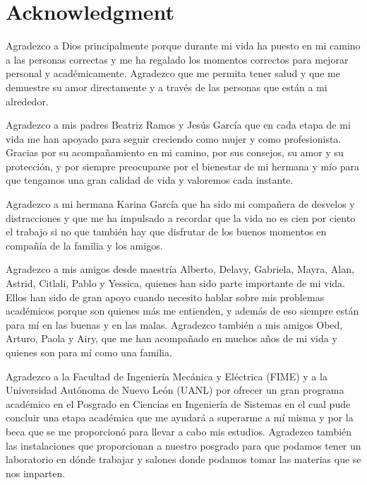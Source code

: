 
\chapter{Acknowledgment}

Agradezco a Dios principalmente porque durante mi vida ha puesto en mi camino a las personas correctas y me ha regalado los momentos correctos para mejorar personal y académicamente. Agradezco que me permita tener salud y que me demuestre su amor directamente y a través de las personas que están a mi alrededor. 

Agradezco a mis padres Beatriz Ramos y Jesús García que en cada etapa de mi vida me han apoyado para seguir creciendo como mujer y como profesionista. Gracias por su acompañamiento en mi camino, por sus consejos, su amor y su protección, y por siempre preocuparse por el bienestar de mi hermana y mío para que tengamos una gran calidad de vida y valoremos cada instante. 

Agradezco a mi hermana Karina García que ha sido mi compañera de desvelos y distracciones y que me ha impulsado a recordar que la vida no es cien por ciento el trabajo si no que también hay que disfrutar de los buenos momentos en compañía de la familia y los amigos.

Agradezco a mis amigos desde maestría Alberto, Delavy, Gabriela, Mayra, Alan, Astrid, Citlali, Pablo y Yessica, quienes han sido parte importante de mi vida. Ellos han sido de gran apoyo cuando necesito hablar sobre mis problemas académicos porque son quienes más me entienden, y además de eso siempre están para mí en las buenas y en las malas. Agradezco también a mis amigos Obed, Arturo, Paola y Airy, que me han acompañado en muchos años de mi vida y quienes son para mí como una familia. 

Agradezco a la Facultad de Ingeniería Mecánica y Eléctrica (FIME) y a la Universidad Autónoma de Nuevo León (UANL) por ofrecer un gran programa a\-ca\-dé\-mi\-co en el Posgrado en Ciencias en Ingeniería de Sistemas en el cual pude concluir una etapa académica que me ayudará a superarme a mí misma y por la beca que se me proporcionó para llevar a cabo mis estudios. Agradezco también las instalaciones que proporcionan a nuestro posgrado para que podamos tener un laboratorio en dónde trabajar y salones donde podamos tomar las materias que se nos imparten.

